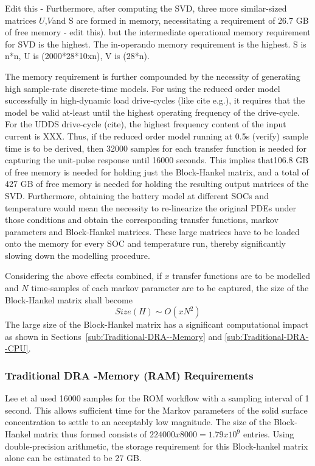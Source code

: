 Edit this - Furthermore, after computing the SVD, three more similar-sized
matrices $U$,$V$and \textgreek{S} are formed in memory, necessitating
a requirement of 26.7 GB of free memory - edit this). but the intermediate
operational memory requirement for SVD is the highest. The in-operando
memory requirement is the highest. S is n{*}n, U is (2000{*}28{*}10xn),
V is (28{*}n).


The memory requirement is further compounded by the necessity of generating
high sample-rate discrete-time models. For using the reduced order
model successfully in high-dynamic load drive-cycles (like cite e.g.),
it requires that the model be valid at-least until the highest operating
frequency of the drive-cycle. For the UDDS drive-cycle (cite), the
highest frequency content of the input current is XXX. Thus, if the
reduced order model running at 0.5s (verify) sample time is to be
derived, then 32000 samples for each transfer function is needed for
capturing the unit-pulse response until 16000 seconds. This implies
that106.8 GB of free memory is needed for holding just the Block-Hankel
matrix, and a total of 427 GB of free memory is needed for holding
the resulting output matrices of the SVD. Furthermore, obtaining the
battery model at different SOCs and temperature would mean the necessity
to re-linearize the original PDEs under those conditions and obtain
the corresponding transfer functions, markov parameters and Block-Hankel
matrices. These large matrices have to be loaded onto the memory for
every SOC and temperature run, thereby significantly slowing down
the modelling procedure.

Considering the above effects combined, if $x$ transfer functions
are to be modelled and $N$ time-samples of each markov parameter
are to be captured, the size of the Block-Hankel matrix shall become
\begin{equation}
Size(H)\sim O(xN^{2})\label{eq:}
\end{equation}
 The large size of the Block-Hankel matrix has a significant computational
impact as shown in Sections~\ref{sub:Traditional-DRA--Memory} and
\ref{sub:Traditional-DRA--CPU}.


\subsubsection{Traditional DRA -Memory (RAM) Requirements\label{sub:Traditional-DRA--Memory}}

Lee et al used 16000 samples for the ROM workflow with a sampling
interval of 1 second. This allows sufficient time for the Markov parameters
of the solid surface concentration to settle to an acceptably low
magnitude. The size of the Block-Hankel matrix thus formed consists
of $224000x8000=1.79x10^{9}$ entries. Using double-precision arithmetic,
the storage requirement for this Block-hankel matrix alone can be
estimated to be 27 GB.

